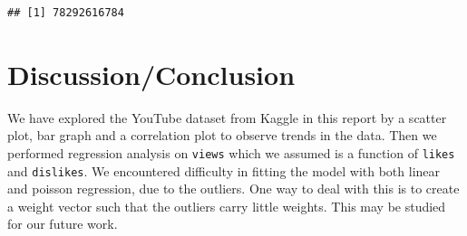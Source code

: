\documentclass[]{article}
\begin{document}
\begin{verbatim}
## [1] 78292616784
\end{verbatim}

\hypertarget{discussionconclusion}{%
\section{Discussion/Conclusion}\label{discussionconclusion}}

We have explored the YouTube dataset from Kaggle in this report by a
scatter plot, bar graph and a correlation plot to observe trends in the
data. Then we performed regression analysis on \texttt{views} which we
assumed is a function of \texttt{likes} and \texttt{dislikes}. We
encountered difficulty in fitting the model with both linear and poisson
regression, due to the outliers. One way to deal with this is to create
a weight vector such that the outliers carry little weights. This may be
studied for our future work.
\end{document}

